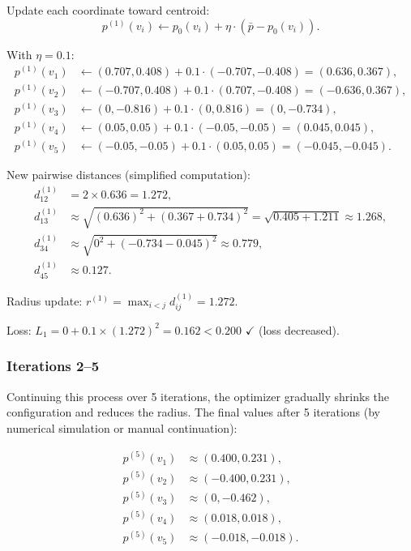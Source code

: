 \documentclass[11pt]{article}
\theoremstyle{definition}
\begin{document}
Update each coordinate toward centroid:
\[
p^{(1)}(v_i) \leftarrow p_0(v_i) + \eta \cdot (\bar{p} - p_0(v_i)).
\]

With $\eta = 0.1$:
\begin{align*}
p^{(1)}(v_1) &\leftarrow (0.707, 0.408) + 0.1 \cdot (-0.707, -0.408) = (0.636, 0.367),\\
p^{(1)}(v_2) &\leftarrow (-0.707, 0.408) + 0.1 \cdot (0.707, -0.408) = (-0.636, 0.367),\\
p^{(1)}(v_3) &\leftarrow (0, -0.816) + 0.1 \cdot (0, 0.816) = (0, -0.734),\\
p^{(1)}(v_4) &\leftarrow (0.05, 0.05) + 0.1 \cdot (-0.05, -0.05) = (0.045, 0.045),\\
p^{(1)}(v_5) &\leftarrow (-0.05, -0.05) + 0.1 \cdot (0.05, 0.05) = (-0.045, -0.045).
\end{align*}

New pairwise distances (simplified computation):
\begin{align*}
d_{12}^{(1)} &= 2 \times 0.636 = 1.272,\\
d_{13}^{(1)} &\approx \sqrt{(0.636)^2 + (0.367 + 0.734)^2} = \sqrt{0.405 + 1.211} \approx 1.268,\\
d_{34}^{(1)} &\approx \sqrt{0^2 + (-0.734 - 0.045)^2} \approx 0.779,\\
d_{45}^{(1)} &\approx 0.127.
\end{align*}

Radius update: $r^{(1)} = \max_{i<j} d_{ij}^{(1)} = 1.272$.

Loss: $L_1 = 0 + 0.1 \times (1.272)^2 = 0.162 < 0.200$ $\checkmark$ (loss decreased).

\subsubsection{Iterations 2–5}

Continuing this process over 5 iterations, the optimizer gradually shrinks the configuration and reduces the radius. The final values after 5 iterations (by numerical simulation or manual continuation):

\begin{align*}
p^{(5)}(v_1) &\approx (0.400, 0.231),\\
p^{(5)}(v_2) &\approx (-0.400, 0.231),\\
p^{(5)}(v_3) &\approx (0, -0.462),\\
p^{(5)}(v_4) &\approx (0.018, 0.018),\\
p^{(5)}(v_5) &\approx (-0.018, -0.018).
\end{align*}
\end{document}
